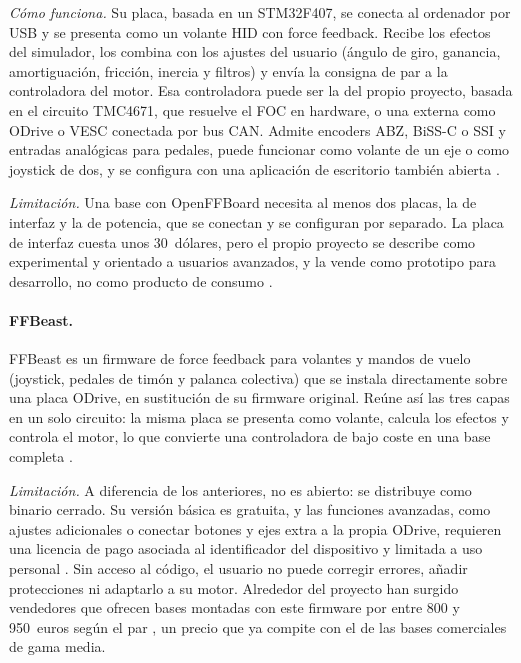 \textit{Cómo funciona.} Su placa, basada en un STM32F407, se conecta al ordenador por USB y se presenta como un volante HID con force feedback. Recibe los efectos del simulador, los combina con los ajustes del usuario (ángulo de giro, ganancia, amortiguación, fricción, inercia y filtros) y envía la consigna de par a la controladora del motor. Esa controladora puede ser la del propio proyecto, basada en el circuito TMC4671, que resuelve el FOC en hardware, o una externa como ODrive o VESC conectada por bus CAN. Admite encoders ABZ, BiSS-C o SSI y entradas analógicas para pedales, puede funcionar como volante de un eje o como joystick de dos, y se configura con una aplicación de escritorio también abierta \parencite{openffboard_github}.

\textit{Limitación.} Una base con OpenFFBoard necesita al menos dos placas, la de interfaz y la de potencia, que se conectan y se configuran por separado. La placa de interfaz cuesta unos 30~dólares, pero el propio proyecto se describe como experimental y orientado a usuarios avanzados, y la vende como prototipo para desarrollo, no como producto de consumo \parencite{openffboard_github}.

\paragraph{FFBeast.}
FFBeast es un firmware de force feedback para volantes y mandos de vuelo (joystick, pedales de timón y palanca colectiva) que se instala directamente sobre una placa ODrive, en sustitución de su firmware original. Reúne así las tres capas en un solo circuito: la misma placa se presenta como volante, calcula los efectos y controla el motor, lo que convierte una controladora de bajo coste en una base completa \parencite{ffbeast_web}.

\textit{Limitación.} A diferencia de los anteriores, no es abierto: se distribuye como binario cerrado. Su versión básica es gratuita, y las funciones avanzadas, como ajustes adicionales o conectar botones y ejes extra a la propia ODrive, requieren una licencia de pago asociada al identificador del dispositivo y limitada a uso personal \parencite{ffbeast_web}. Sin acceso al código, el usuario no puede corregir errores, añadir protecciones ni adaptarlo a su motor. Alrededor del proyecto han surgido vendedores que ofrecen bases montadas con este firmware por entre 800 y 950~euros según el par \parencite{ffbeast_web}, un precio que ya compite con el de las bases comerciales de gama media.

